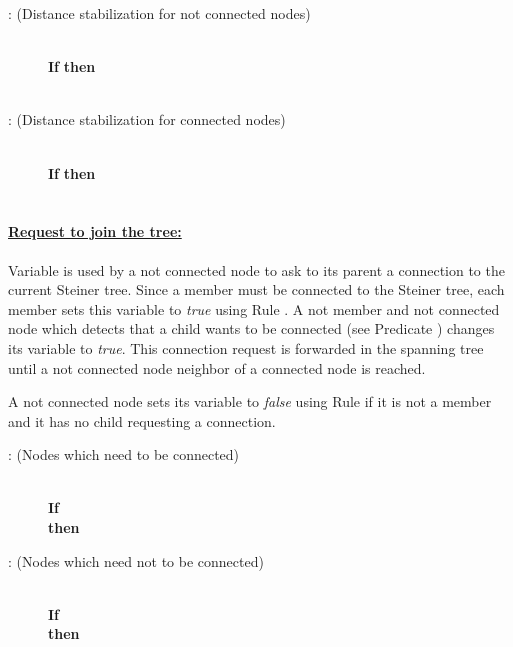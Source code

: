 \documentclass[11pt]{article}
\newcommand{\ARA}{}
\newcommand{\ARB}{}
\newcommand{\CRB}{}
\newcommand{\CRC}{}
\begin{document}
\begin{small}
\begin{description}
\item[\ARA : (Distance stabilization for not connected nodes)]~\\\textbf{If}  \textbf{then}\\ 
\hspace*{0,8cm} \\
\hspace*{0,8cm} 

\item[\ARB: (Distance stabilization for connected nodes)]~\\\textbf{If}  \textbf{then}\\ \hspace*{0,8cm} \\
\hspace*{0,8cm}
\end{description}
\end{small}
\paragraph{\underline{Request to join the tree:}}

Variable  is used by a not connected node to ask to its parent
a connection to the current Steiner tree. 
Since a member must be connected to the Steiner tree, each member sets
this variable to \emph{true} using Rule \CRB. 
A not member and not connected node which detects that a child wants
to be connected (see Predicate ) 
changes its variable  to \emph{true}. This connection request
is forwarded in the spanning 
tree until a not connected node neighbor of a connected node is
reached.

A not connected node sets its variable  to \emph{false} using
Rule \CRC\/ if it is not a member and it has no child requesting a
connection. 




\begin{small}
\begin{description}
\item[\CRB: (Nodes which need to be connected)]~\\\textbf{If} \\
\textbf{then} 
\item[\CRC: (Nodes which need not to be connected)]~\\\textbf{If}  \\
\textbf{then} 
\end{description}
\end{small}
\end{document}
